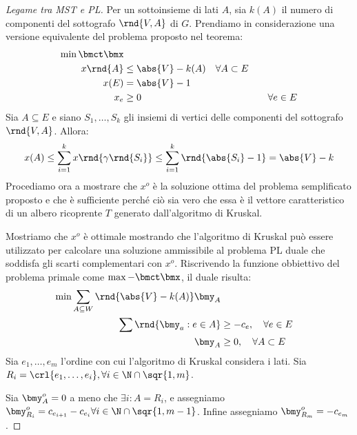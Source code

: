 \documentclass[\main/main.tex]{subfiles}
\begin{document}
\begin{proof}[Legame tra MST e PL]
  Per un sottoinsieme di lati \(A\), sia \(k(A)\) il numero di componenti del sottografo \(\rnd{V, A}\) di \(G\). Prendiamo in considerazione una versione equivalente del problema proposto nel teorema:
  \begin{align*}
    \min \bmct\bmx                                                                   \\
    x\rnd{A} & \leq \abs{V} - k(A) \quad \forall A \subset E                         \\
    x(E)     & = \abs{V} -1                                                          \\
    x_e      & \geq 0                                        & \quad \forall e \in E
  \end{align*}
  Sia \(A \subseteq E\) e siano \(S_1, \ldots, S_k\) gli insiemi di vertici delle componenti del sottografo \(\rnd{V, A}\). Allora:
  \[
    x(A) \leq \sum_{i=1}^k x\rnd{\gamma\rnd{S_i}} \leq \sum_{i=1}^k \rnd{\abs{S_i}-1} = \abs{V} - k
  \]
  Procediamo ora a mostrare che \(x^o\) è la soluzione ottima del problema semplificato proposto e che è sufficiente perché ciò sia vero che essa è il vettore caratteristico di un albero ricoprente \(T\) generato dall'algoritmo di Kruskal.

  Mostriamo che \(x^o\) è ottimale mostrando che l'algoritmo di Kruskal può essere utilizzato per calcolare una soluzione ammissibile al problema PL duale che soddisfa gli scarti complementari con \(x^o\). Riscrivendo la funzione obbiettivo del problema primale come \(\max -\bmct\bmx \), il duale risulta:
  \begin{align*}
    \min \sum_{A \subseteq W} \rnd{\abs{V} - k(A)}\bmy_A           \\
    \sum \rnd{\bmy_a: e \in A} & \geq -c_e, \quad \forall e \in E  \\
    \bmy_A                     & \geq 0, \quad \forall A \subset E
  \end{align*}
  Sia \(e_1, \ldots, e_m\) l'ordine con cui l'algoritmo di Kruskal considera i lati. Sia \(R_i = \crl{e_1, \ldots, e_i}, \forall i \in \N \cap \sqr{1, m}\).

  Sia \(\bmy_A^o=0\) a meno che \(\exists i: A = R_i\), e assegniamo \(\bmy^o_{R_i} = c_{e_{i+1}} - c_{e_{i}} \forall i \in \N \cap \sqr{1, m-1}\). Infine assegniamo \(\bmy^o_{R_m} = -c_{e_m}\).


\end{proof}
\end{document}
